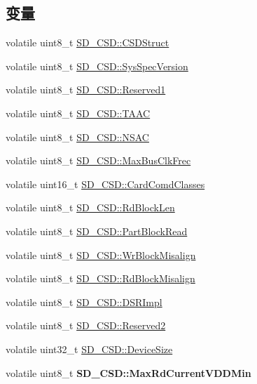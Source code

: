 \subsection*{变量}
\begin{DoxyCompactItemize}
\item 
volatile uint8\+\_\+t \hyperlink{group__sd__card_ga700c48bc2c031e2b002dd551a1af154c}{S\+D\+\_\+\+C\+S\+D\+::\+C\+S\+D\+Struct}
\item 
volatile uint8\+\_\+t \hyperlink{group__sd__card_gae42076ec74babfee72c7a3705d13461a}{S\+D\+\_\+\+C\+S\+D\+::\+Sys\+Spec\+Version}
\item 
volatile uint8\+\_\+t \hyperlink{group__sd__card_gab7c521a48dcc810a5b1b76278d5bebb2}{S\+D\+\_\+\+C\+S\+D\+::\+Reserved1}
\item 
volatile uint8\+\_\+t \hyperlink{group__sd__card_gac3a3b789a57530a170119a3459571632}{S\+D\+\_\+\+C\+S\+D\+::\+T\+A\+AC}
\item 
volatile uint8\+\_\+t \hyperlink{group__sd__card_gaf243b37ec081b6ef479a3d2d50668543}{S\+D\+\_\+\+C\+S\+D\+::\+N\+S\+AC}
\item 
volatile uint8\+\_\+t \hyperlink{group__sd__card_gab044e6cb2434800c2dd10fbd71519a64}{S\+D\+\_\+\+C\+S\+D\+::\+Max\+Bus\+Clk\+Frec}
\item 
volatile uint16\+\_\+t \hyperlink{group__sd__card_ga2777d2837a2db0a106ce0a915253f24d}{S\+D\+\_\+\+C\+S\+D\+::\+Card\+Comd\+Classes}
\item 
volatile uint8\+\_\+t \hyperlink{group__sd__card_ga03458802593a7d3eeffa8518b204ba73}{S\+D\+\_\+\+C\+S\+D\+::\+Rd\+Block\+Len}
\item 
volatile uint8\+\_\+t \hyperlink{group__sd__card_gad1480fb0cce305cbec05307b277fe9e6}{S\+D\+\_\+\+C\+S\+D\+::\+Part\+Block\+Read}
\item 
volatile uint8\+\_\+t \hyperlink{group__sd__card_gac92bbdc65323bdaa2738ba34fb801694}{S\+D\+\_\+\+C\+S\+D\+::\+Wr\+Block\+Misalign}
\item 
volatile uint8\+\_\+t \hyperlink{group__sd__card_ga897fc62e6505259c20ac4490a589a09c}{S\+D\+\_\+\+C\+S\+D\+::\+Rd\+Block\+Misalign}
\item 
volatile uint8\+\_\+t \hyperlink{group__sd__card_ga96e5ee8c184999bd5f2b007015e2a7a9}{S\+D\+\_\+\+C\+S\+D\+::\+D\+S\+R\+Impl}
\item 
volatile uint8\+\_\+t \hyperlink{group__sd__card_gae550128917d915a10d07cc6bab428d4a}{S\+D\+\_\+\+C\+S\+D\+::\+Reserved2}
\item 
volatile uint32\+\_\+t \hyperlink{group__sd__card_ga3ef41bf634f8340f737de91de78e33f8}{S\+D\+\_\+\+C\+S\+D\+::\+Device\+Size}
\item 
volatile uint8\+\_\+t {\bfseries S\+D\+\_\+\+C\+S\+D\+::\+Max\+Rd\+Current\+V\+D\+D\+Min}\hypertarget{group__sd__card_gaa2cbdc29ba8b93b465f9ec426eca68c3}{}\label{group__sd__card_gaa2cbdc29ba8b93b465f9ec426eca68c3}


\end{DoxyCompactItemize}

